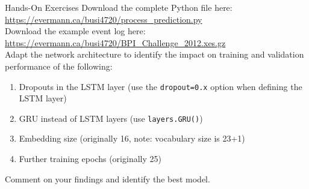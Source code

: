 \documentclass[ignorenonframetext,xcolor=x11names]{beamer}
\begin{document}
\begin{frame}{Hands-On Exercises}
\small
Download the complete Python file here: \url{https://evermann.ca/busi4720/process_prediction.py} \\
Download the example event log here: \url{https://evermann.ca/busi4720/BPI_Challenge_2012.xes.gz} \\

Adapt the network architecture to identify the impact on training and validation performance of the following:
   \begin{enumerate}
      \item Dropouts in the LSTM layer (use the \texttt{dropout=0.x} option when defining the LSTM layer)
      \item GRU instead of LSTM layers (use \texttt{layers.GRU()})
      \item Embedding size (originally 16, note: vocabulary size is 23+1)
      \item Further training epochs (originally 25)
   \end{enumerate}
Comment on your findings and identify the best model. \\
\end{frame}
\end{document}
